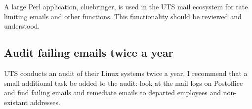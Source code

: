 \documentclass{article}
\begin{document}
A large Perl application, cluebringer, is used in the UTS mail
ecosystem for rate limiting emails and other functions. This
functionality should be reviewed and understood.

\subsection{Audit failing emails twice a year}

UTS conducts an audit of their Linux systems twice a year. I recommend
that a small additional task be added to the audit: look at the
mail logs on Postoffice and find failing emails and remediate
emails to departed employees and non-existant addresses.
\end{document}
